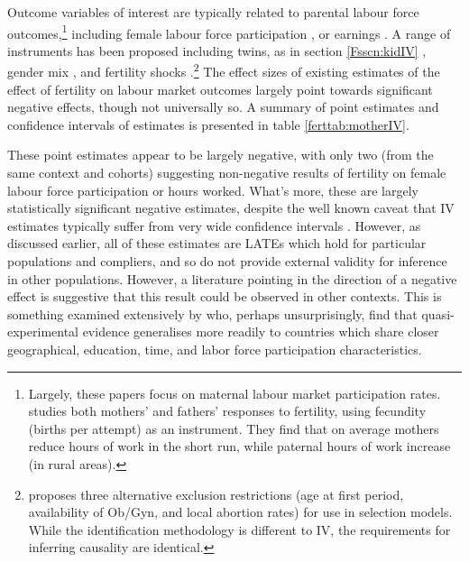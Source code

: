 Outcome variables of interest are typically related to parental labour 
force outcomes,\footnote{Largely, these papers focus on maternal labour
market participation rates. \citet{KimAassve2006} studies both mothers' and
fathers' responses to fertility, using fecundity (births per attempt) as an
instrument.  They find that on average mothers reduce hours of work in the short 
run, while paternal hours of work increase (in rural areas).} including female 
labour force participation \citep{AgueroMarks2008,AgueroMarks2011,ChunOh2002,
Caceres2008,AngristEvans1998}, or earnings \citep{Caceres2006,Hotzetal1997,
Jacobsenetal1999}.  A range of instruments has been proposed including twins,
as in section \ref{Fsscn:kidIV} \citep{RosenzweigWolpin1980b,Jacobsenetal1999,
BronarsGrogger1994}, gender mix \citep{AgueroMarks2008,AgueroMarks2011,
ChunOh2002}, and fertility shocks \citep{Miller2011,Cristia2008,
RosenzweigSchultz1987}.\footnote{\citet{Ribar1994} proposes three alternative
exclusion restrictions (age at first period, availability of Ob/Gyn, and local
abortion rates) for use in selection models.  While the identification 
methodology is different to IV, the requirements for inferring causality are 
identical.}  The effect sizes of existing estimates of the effect of fertility 
on labour market outcomes largely point towards significant negative effects, 
though not universally so.  A summary of point estimates and confidence 
intervals of estimates is presented in table \ref{ferttab:motherIV}.



These point estimates appear to be largely negative, with only two (from the
same context and cohorts) suggesting non-negative results of fertility on
female labour force participation or hours worked.  What's more, these are
largely statistically significant negative estimates, despite the well known 
caveat that IV estimates typically suffer from very wide confidence intervals 
\citep{Angristetal2010}.  However, as discussed earlier, all of these
estimates are LATEs which hold for particular populations and compliers, and
so do not provide external validity for inference in other populations. 
However, a literature pointing in the direction of a negative effect is
suggestive that this result could be observed in other contexts.  This is
something examined extensively by \citet{Deheijaetal2015} who, perhaps
unsurprisingly, find that quasi-experimental evidence generalises more
readily to countries which share closer geographical, education, time, 
and labor force participation characteristics.


